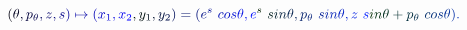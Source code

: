\documentclass[12pt]{article}
\begin{document}
\makeatletter
\renewcommand*{\@textcolor}[3]{%
  \protect\leavevmode
  \begingroup
    \color#1{#2}#3%
  \endgroup
}
\makeatother
\begin{displaymath}
\mathcolor[RGB]{0,0,15}{(} \mathcolor[RGB]{0,0,30}{\theta} \mathcolor[RGB]{0,0,45}{,} \mathcolor[RGB]{0,0,60}{p} _ { \mathcolor[RGB]{0,0,75}{\theta} } \mathcolor[RGB]{0,0,90}{,} \mathcolor[RGB]{0,0,105}{z} \mathcolor[RGB]{0,0,120}{,} \mathcolor[RGB]{0,0,135}{s} \mathcolor[RGB]{0,0,150}{)} \mathcolor[RGB]{0,0,165}{\mapsto} \mathcolor[RGB]{0,0,180}{(} \mathcolor[RGB]{0,0,195}{x} _ { \mathcolor[RGB]{0,0,210}{1} } \mathcolor[RGB]{0,0,225}{,} \mathcolor[RGB]{0,0,240}{x} _ { \mathcolor[RGB]{0,0,255}{2} } \mathcolor[RGB]{0,15,0}{,} \mathcolor[RGB]{0,15,15}{y} _ { \mathcolor[RGB]{0,15,30}{1} } \mathcolor[RGB]{0,15,45}{,} \mathcolor[RGB]{0,15,60}{y} _ { \mathcolor[RGB]{0,15,75}{2} } \mathcolor[RGB]{0,15,90}{)} \mathcolor[RGB]{0,15,105}{=} \mathcolor[RGB]{0,15,120}{(} \mathcolor[RGB]{0,15,135}{e} ^ { \mathcolor[RGB]{0,15,150}{s} } \mathcolor[RGB]{0,15,165}{\operatorname*} { \mathcolor[RGB]{0,15,180}{c} \mathcolor[RGB]{0,15,195}{o} \mathcolor[RGB]{0,15,210}{s} } \mathcolor[RGB]{0,15,225}{\theta} \mathcolor[RGB]{0,15,240}{,} \mathcolor[RGB]{0,15,255}{e} ^ { \mathcolor[RGB]{0,30,0}{s} } \mathcolor[RGB]{0,30,15}{\operatorname*} { \mathcolor[RGB]{0,30,30}{s} \mathcolor[RGB]{0,30,45}{i} \mathcolor[RGB]{0,30,60}{n} } \mathcolor[RGB]{0,30,75}{\theta} \mathcolor[RGB]{0,30,90}{,} \mathcolor[RGB]{0,30,105}{p} _ { \mathcolor[RGB]{0,30,120}{\theta} } \mathcolor[RGB]{0,30,135}{\operatorname*} { \mathcolor[RGB]{0,30,150}{s} \mathcolor[RGB]{0,30,165}{i} \mathcolor[RGB]{0,30,180}{n} } \mathcolor[RGB]{0,30,195}{\theta} \mathcolor[RGB]{0,30,210}{,} \mathcolor[RGB]{0,30,225}{z} \mathcolor[RGB]{0,30,240}{\operatorname*} { \mathcolor[RGB]{0,30,255}{s} \mathcolor[RGB]{0,45,0}{i} \mathcolor[RGB]{0,45,15}{n} } \mathcolor[RGB]{0,45,30}{\theta} \mathcolor[RGB]{0,45,45}{+} \mathcolor[RGB]{0,45,60}{p} _ { \mathcolor[RGB]{0,45,75}{\theta} } \mathcolor[RGB]{0,45,90}{\operatorname*} { \mathcolor[RGB]{0,45,105}{c} \mathcolor[RGB]{0,45,120}{o} \mathcolor[RGB]{0,45,135}{s} } \mathcolor[RGB]{0,45,150}{\theta} \mathcolor[RGB]{0,45,165}{)} \mathcolor[RGB]{0,45,180}{.}
\end{displaymath}
\end{document}

